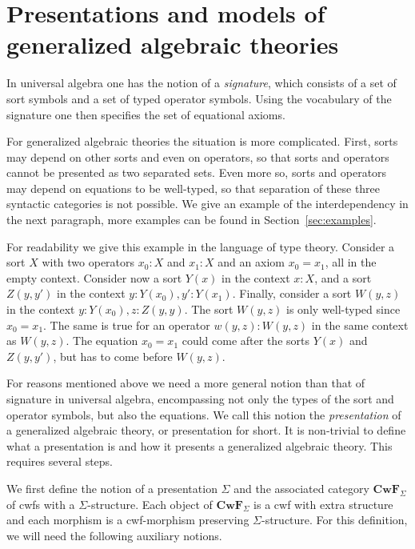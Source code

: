 \documentclass{mscs}
\newcommand{\FYI}[1]{{#1}}
\def\Cwf{\mathbf{CwF}}
\begin{document}
\section{Presentations and models of generalized algebraic theories}\label{gat-sig-mod}

In universal algebra one has the notion of a \emph{signature},
which consists of a set of sort symbols and a set of typed operator symbols.
Using the vocabulary of the signature one then specifies the set
of equational axioms. 

For generalized algebraic theories the situation is more complicated.
First, sorts may depend on other sorts and even on operators,
so that sorts and operators cannot be presented as two separated sets.
Even more so, sorts and operators may depend on equations to
be well-typed, so that separation of these three syntactic
categories is not possible. We give an example of the interdependency 
in the next paragraph, more examples can be found in Section~\ref{sec:examples}.

For readability we give this example in the language of type theory.
Consider a sort $X$ with two operators $x_0 :X$ and $x_1 : X$
and an axiom $x_0 = x_1$, all in the empty context. Consider now a sort
$Y(x)$ in the context $x:X$, and a sort $Z(y,y')$ in the context
$y:Y(x_0), y':Y(x_1)$. Finally, consider a sort $W(y,z)$ in the
context $y:Y(x_0), z:Z(y,y)$. The sort $W(y,z)$ is only well-typed
since $x_0 = x_1$. The same is true for an operator $w(y,z): W(y,z)$
in the same context as $W(y,z)$. The equation $x_0 = x_1$ could come
after the sorts $Y(x)$ and $Z(y,y')$, but has to come before $W(y,z)$.

For reasons mentioned above we need a more general notion
than that of signature in universal algebra, encompassing not only the types of the sort and operator symbols, but also the equations.  
We call this notion the \emph{presentation} of a generalized algebraic theory,
or presentation for short. It is non-trivial to define what a presentation
is and how it presents a generalized algebraic theory.
This requires several steps.

We first define the notion of a \FYI{presentation} $\Sigma$ and the associated category $\Cwf_{\Sigma}$ of cwfs with a $\Sigma$-structure.
Each object of $\Cwf_{\Sigma}$ is a cwf with extra structure and
each morphism is a cwf-morphism preserving $\Sigma$-structure.
For this definition, we will need the following auxiliary notions.
\end{document}
